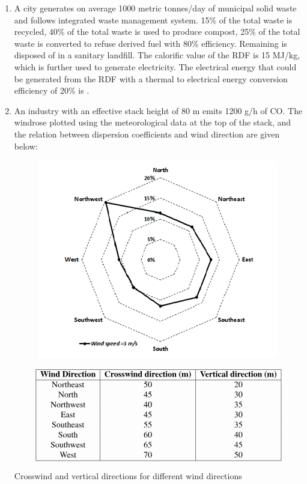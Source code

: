 \documentclass[journal,12pt,onecolumn]{IEEEtran}
\theoremstyle{remark}
\begin{document}
\begin{enumerate}
\item A city generates on average 1000 metric tonnes/day of municipal solid waste and follows integrated waste management system. 15\% of the total waste is recycled, 40\% of the total waste is used to produce compost, 25\% of the total waste is converted to refuse derived fuel  with 80\% efficiency. Remaining is disposed of in a sanitary landfill. The calorific value of the RDF is 15 MJ/kg, which is further used to generate electricity. The electrical energy that could be generated from the RDF with a thermal to electrical energy conversion efficiency of 20\% is \underline{\hspace{2cm}} .  
\hfill{}

\newpage

\item An industry with an effective stack height of 80 m emits 1200 g/h of CO. The windrose plotted using the meteorological data at the top of the stack, and the relation between dispersion coefficients and wind direction are given below:

\begin{center}
\begin{figure}[h]
    \centering
    \includegraphics[width=0.5\columnwidth]{figs/img 6 (2).jpeg}
    \caption{}
    \label{fig:placeholder}
\end{figure}

\end{center}

\begin{table}[h!]
\centering
\[
\begin{array}{|c|c|c|}
\hline
\textbf{Wind Direction} & \textbf{Crosswind direction (m)} & \textbf{Vertical direction (m)} \\
\hline
\text{Northeast} & 50 & 20 \\
\text{North}     & 45 & 30 \\
\text{Northwest} & 40 & 35 \\
\text{East}      & 45 & 30 \\
\text{Southeast} & 55 & 35 \\
\text{South}     & 60 & 40 \\
\text{Southwest} & 65 & 45 \\
\text{West}      & 70 & 50 \\
\hline
\end{array}
\]
\caption{Crosswind and vertical directions for different wind directions}
\label{tab:wind}
\end{table}



\end{enumerate}
\end{document}

